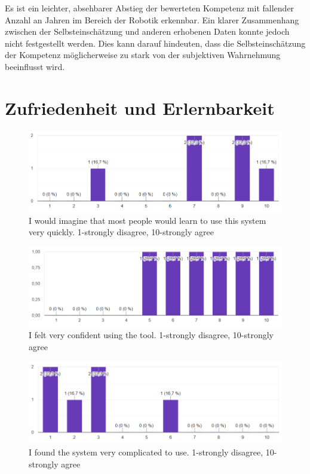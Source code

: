 \documentclass[german,version-2020-11]{uzl-thesis}
\begin{document}
  Es ist ein leichter, absehbarer Abstieg der bewerteten Kompetenz mit fallender Anzahl an Jahren im Bereich der Robotik erkennbar. 
  Ein klarer Zusammenhang zwischen der Selbsteinschätzung und anderen erhobenen Daten konnte jedoch nicht festgestellt werden. 
  Dies kann darauf hindeuten, dass die Selbsteinschätzung der Kompetenz möglicherweise zu stark von der subjektiven Wahrnehmung beeinflusst wird.

\section{Zufriedenheit und Erlernbarkeit}
  \begin{figure}[htpb]
    \centering
    \includegraphics[scale=0.8]{figures/post_question1.png}
    \caption{I would imagine that most people would learn to use this system very quickly. 1-strongly disagree, 10-strongly agree}
    \label{fig-postq1}
  \end{figure}


  \begin{figure}[htpb]
    \centering
    \includegraphics[scale=0.8]{figures/post_question5.png}
    \caption{I felt very confident using the tool. 1-strongly disagree, 10-strongly agree}
    \label{fig-postq5}
  \end{figure}

  \begin{figure}[htpb]
    \centering
    \includegraphics[scale=0.8]{figures/post_question6.png}
    \caption{I  found the system very complicated to use. 1-strongly disagree, 10-strongly agree }
    \label{fig-postq6}
  \end{figure}
\end{document}

